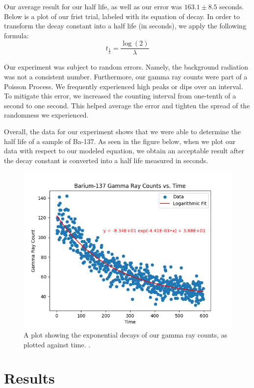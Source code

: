 \documentclass[10pt,letterpaper,onecolumn]{article}
\begin{document}
Our average result for our half life, as well as our error was $163.1 \pm 8.5$ seconds.
Below is a plot of our frist trial, labeled with its equation of decay. In order to 
transform the decay constant into a half life (in seconds), we apply the following formula:
$$
t_{\frac{1}{2}} = \frac{\log(2)}{\lambda}
$$

Our experiment was subject to random errors. Namely, the background radiation was not
a consistent number. Furthermore, our gamma ray counts were part of a Poisson Process.
We frequently experienced high peaks or dips over an interval. To mitigate this error,
we increased the counting interval from one-tenth of a second to one second. This helped
average the error and tighten the spread of the randomness we experienced.

Overall, the data for our experiment shows that we were able to determine the 
half life of a sample of Ba-137. As seen in the figure below, when we plot our
data with respect to our modeled equation, we obtain an acceptable result after
the decay constant is converted into a half life measured in seconds. 
\begin{figure}[!htb]
  \centering
  \includegraphics[width=.9\textwidth]{../images/day3_liquidtrial3_plot.png}
  \caption{A plot showing the exponential decays of our gamma ray counts, as plotted against time. .\label{fig:GammaRays} }
\end{figure}

\newpage





\section{Results}
\end{document}
